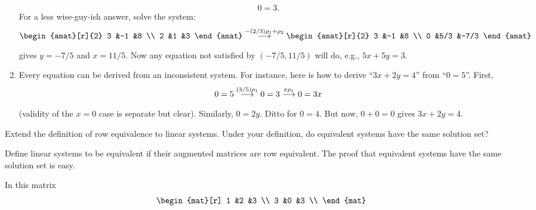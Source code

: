 \begin{exercises}
\begin{answer}
\begin{enumerate}
          \begin{equation*}
            0=3.
          \end{equation*}
          For a less wise-guy-ish answer, solve the system:
          \begin{equation*}
            \begin{amat}[r]{2}
              3  &-1  &8  \\
              2  &1   &3
            \end{amat}
            \grstep{-(2/3)\rho_1+\rho_2}
            \begin{amat}[r]{2}
              3  &-1  &8    \\
              0  &5/3 &-7/3
            \end{amat}
          \end{equation*}
          gives \( y=-7/5 \) and \( x=11/5 \).
          Now any equation not satisfied by \( (-7/5,11/5) \) will do,
          e.g., \( 5x+5y=3 \).
        \item Every equation can be derived from an inconsistent system.
          For instance, here is how to derive ``\( 3x+2y=4 \)'' from
          ``\( 0=5 \)''.
          First,
          \begin{equation*}
            0=5
            \mathrel{ \mathop{\longrightarrow}\limits^{(3/5)\rho_1\mathstrut}_{ \begin{subarray}{l} \relax \end{subarray}}}
            0=3
            \mathrel{ \mathop{\longrightarrow}\limits^{x\rho_1\mathstrut}_{ \begin{subarray}{l} \relax \end{subarray}}}
            0=3x
          \end{equation*}
          (validity of the \( x=0 \) case is separate but clear).
          Similarly, \( 0=2y \).
          Ditto for \( 0=4 \).
          But now, \( 0+0=0 \) gives \( 3x+2y=4 \).
     \end{enumerate}  
    \end{answer}
  \item 
    Extend the definition of row equivalence to linear systems.
    Under your definition, do equivalent systems have the same solution set?
    \cite{HoffmanKunze}
    \begin{answer}
      Define linear systems to be equivalent if their augmented
      matrices are row equivalent.
      The proof that equivalent systems have the same solution set is easy.  
    \end{answer}
  \recommended \item 
    In this matrix
    \begin{equation*}
      \begin{mat}[r]
        1  &2  &3  \\
        3  &0  &3  \\

\end{mat}
\end{equation*}
\end{exercises}

